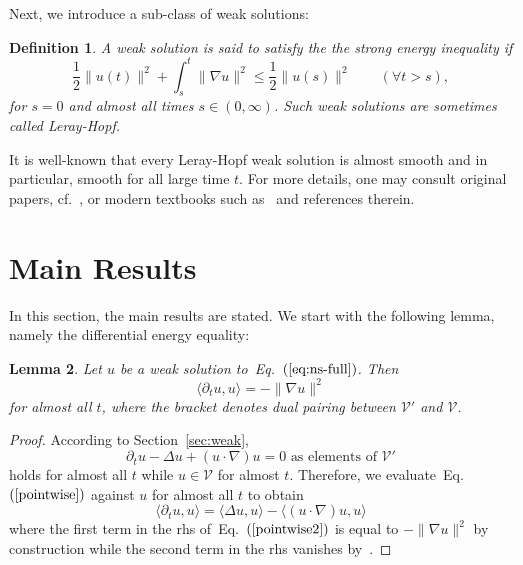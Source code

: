 \documentclass{article}
\newtheorem{definition}{Definition}
\newtheorem{lem}[definition]{Lemma}
\def\eq#1{Eq.~$(\ref{#1})$}
\def\V{{\mathcal{V}}}
\begin{document}
Next, we introduce a sub-class of weak solutions:
\begin{definition}
\label{lh def}
   A weak solution is said to satisfy the the strong energy inequality if
\begin{equation}
  \label{eq:see}
  \frac{1}{2} \lVert u(t)\rVert^2 + \int_s^t \lVert \nabla u\rVert^2 \le
  \frac{1}{2}\lVert u(s)\rVert^2 \qquad (\forall t>s),
\end{equation}
for $s = 0$ and almost all times $s\in(0,\infty)$. Such weak solutions are sometimes called Leray-Hopf.
\end{definition}
It is well-known that every Leray-Hopf weak solution is almost smooth and in particular, smooth for all large time $t$. For more details, one may consult original papers, cf.~\cite{CafKohNir82}, or modern textbooks such as~\cite[Theorem 8.14]{RobRodSad16} and references therein.



\section{Main Results}
\label{sec:core1}

In this section, the main results are stated. We start with the following lemma, namely the differential energy equality:





\begin{lem}
  \label{thm:tderiv}
   Let $u$ be a weak solution to~\eq{eq:ns-full}. Then
  \begin{equation}
    \label{eq:tderiv}
    \langle \partial_t u, u \rangle = -\lVert \nabla u\rVert^2
  \end{equation}
  for almost all $t$, where the bracket denotes dual pairing between $\V'$ and $\V$.
\end{lem}

\begin{proof}
According to Section~\ref{sec:weak},
\begin{equation}
\label{pointwise}
      \partial_t u -\Delta u + (u \cdot \nabla)u = 0 \text{ as elements of }  \V'
\end{equation}
holds for almost all $t$ while $u \in \V$ for almost $t$. Therefore, we evaluate~\eq{pointwise} against $u$ for almost all $t$ to obtain
\begin{equation}
\label{pointwise2}
     \langle \partial_t u, u \rangle= \langle \Delta u, u \rangle- \langle  (u \cdot \nabla)u, u \rangle
\end{equation}
where the first term in the rhs of~\eq{pointwise2} is equal to $-\lVert \nabla u\rVert^2$ by construction while the second term in the rhs vanishes by~\cite[Lemma~3.2]{RobRodSad16}.
\end{proof}
\end{document}
